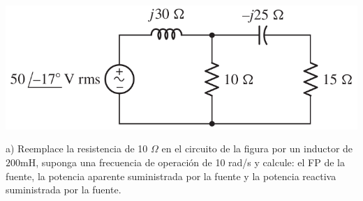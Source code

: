 \documentclass[10pt,letterpaper]{article}
\begin{document}
\includegraphics[scale=0.45]{c_p3}

a) Reemplace la resistencia de 10 $\Omega$ en el circuito de la figura por un inductor de $200 \mathrm{mH}$, suponga una frecuencia de operación de 10 rad/s y calcule: el FP de la fuente, la potencia aparente suministrada por la fuente y la potencia reactiva suministrada por la fuente.
\end{document}
